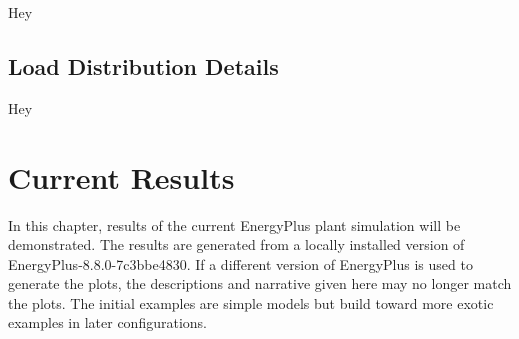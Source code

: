 \documentclass{report}
\begin{document}
      Hey

    \section{Load Distribution Details}\label{sec:modeling-dispatch}

      Hey

  \chapter{Current Results}\label{ch:current}

    In this chapter, results of the current EnergyPlus plant simulation will be demonstrated.
    The results are generated from a locally installed version of EnergyPlus-8.8.0-7c3bbe4830.
    If a different version of EnergyPlus is used to generate the plots, the descriptions and narrative given here may no longer match the plots.
    The initial examples are simple models but build toward more exotic examples in later configurations.
\end{document}
